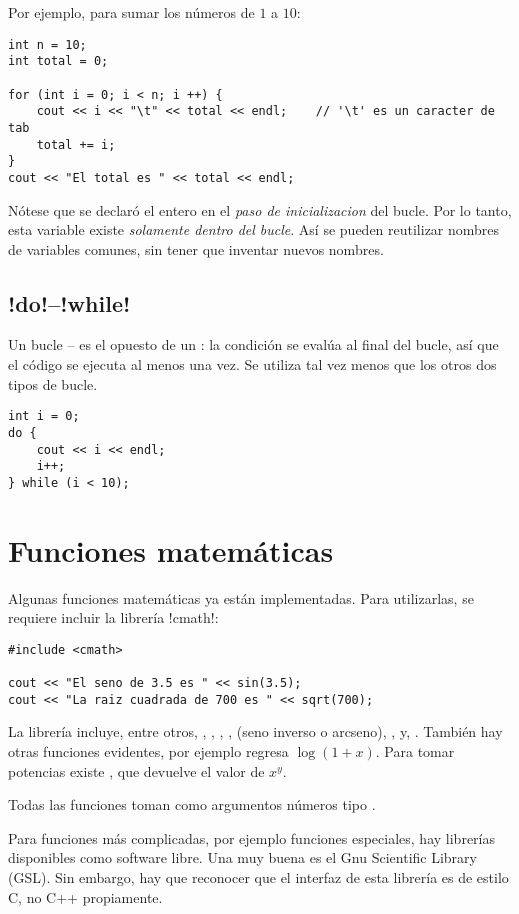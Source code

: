 Por ejemplo, para sumar los números de $1$ a $10$:
\begin{lstlisting}
int n = 10;
int total = 0;

for (int i = 0; i < n; i ++) {
	cout << i << "\t" << total << endl;    // '\t' es un caracter de tab
	total += i;  
}
cout << "El total es " << total << endl;
\end{lstlisting}

Nótese que se declaró el entero  en el \emph{paso de inicializacion} del
bucle. Por lo tanto,  esta variable existe \emph{solamente dentro del
bucle}.  Así se pueden reutilizar nombres de variables comunes, sin
tener que inventar nuevos nombres.

\subsection{\inl!do!--\inl!while!}

Un bucle -- es el opuesto de un : la condición se
evalúa al final del bucle, así que el código se ejecuta al menos una
vez. Se utiliza tal vez menos que los otros dos tipos de bucle.
\begin{lstlisting}
int i = 0;
do {
	cout << i << endl;
	i++;
} while (i < 10);
\end{lstlisting}


 \section{Funciones matemáticas}


Algunas funciones matemáticas ya están  implementadas. Para utilizarlas, se
requiere incluir la librería \inl!cmath!:
\begin{lstlisting}
#include <cmath>

cout << "El seno de 3.5 es " << sin(3.5);
cout << "La raiz cuadrada de 700 es " << sqrt(700);
\end{lstlisting}

La librería  incluye, entre otros, , , ,
,  
  (seno inverso o arcseno), ,  y, . También hay
otras funciones 
evidentes, por ejemplo  regresa $\log(1+x)$. Para tomar potencias
existe
, que devuelve el valor de $x^y$.

Todas las funciones toman como argumentos números tipo .

Para funciones más complicadas, por ejemplo funciones especiales, hay librerías
disponibles como software libre. Una muy buena es el Gnu Scientific Library
(GSL). Sin embargo, hay que reconocer que el interfaz de esta librería es de
estilo C, no C++ propiamente.

